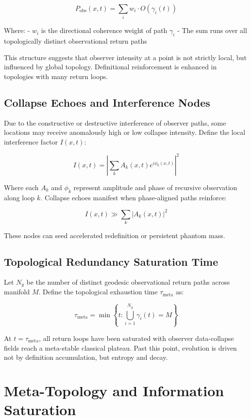 \[
P_{\text{obs}}(x,t) = \sum_{i} w_i \cdot O(\gamma_i(t))
\]

Where:
- \( w_i \) is the directional coherence weight of path \( \gamma_i \)
- The sum runs over all topologically distinct observational return paths

This structure suggests that observer intensity at a point is not strictly local, but influenced by global topology. Definitional reinforcement is enhanced in topologies with many return loops\cite{weeks1998overview}.

\subsection{Collapse Echoes and Interference Nodes}

Due to the constructive or destructive interference of observer paths, some locations may receive anomalously high or low collapse intensity. Define the local interference factor \( I(x,t) \):

\[
I(x,t) = \left| \sum_{k} A_k(x,t) e^{i \phi_k(x,t)} \right|^2
\]

Where each \( A_k \) and \( \phi_k \) represent amplitude and phase of recursive observation along loop \( k \). Collapse echoes manifest when phase-aligned paths reinforce:

\[
I(x,t) \gg \sum_k |A_k(x,t)|^2
\]

These nodes can seed accelerated redefinition or persistent phantom mass.

\subsection{Topological Redundancy Saturation Time}

Let \( N_g \) be the number of distinct geodesic observational return paths across manifold \( M \). Define the topological exhaustion time \( \tau_{\text{meta}} \) as:

\[
\tau_{\text{meta}} = \min \left\{ t : \bigcup_{i=1}^{N_g} \gamma_i(t) = M \right\}
\]

At \( t = \tau_{\text{meta}} \), all return loops have been saturated with observer data-collapse fields reach a meta-stable classical plateau. Past this point, evolution is driven not by definition accumulation, but entropy and decay\cite{copi2009large}.

\section{Meta-Topology and Information Saturation}

